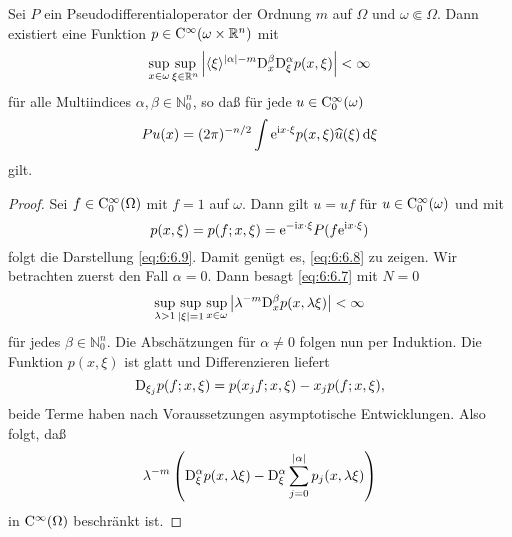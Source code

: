 \begin{thm}
Sei $P$ ein Pseudodifferentialoperator der Ordnung $m$ auf $\Omega$ und $\omega\Subset\Omega$. Dann existiert eine Funktion
$p\in\mathrm C^\infty(\omega\times\mathbb R^n)$ mit
\begin{equation}\label{eq:6:6.8}
     \sup_{x\in\omega} \sup_{\xi\in\mathbb R^n} \left| \langle\xi\rangle^{|\alpha|-m} \mathrm D_x^\beta \mathrm D_\xi^\alpha p(x,\xi) \right| < \infty
\end{equation}
für alle Multiindices $\alpha,\beta\in\mathbb N_0^n$, so daß für jede $u\in\mathrm C_0^\infty(\omega)$
\begin{equation}\label{eq:6:6.9}
   Pu(x) = (2\pi)^{-n/2} \int \mathrm e^{\mathrm i x\cdot\xi} p(x,\xi) \widehat u(\xi) \,\mathrm d\xi
\end{equation}
gilt.
\end{thm}
\begin{proof}
Sei $f\in\mathrm C_0^\infty(\Omega)$ mit $f=1$ auf $\omega$. Dann gilt $u=uf$ für $u\in\mathrm C_0^\infty(\omega)$ und mit 
\begin{equation}
   p(x,\xi) = p(f;x,\xi) =   \mathrm e^{-\mathrm i x\cdot\xi} P(f\mathrm e^{\mathrm i x\cdot\xi})
\end{equation}
folgt die Darstellung \eqref{eq:6:6.9}. Damit genügt es, \eqref{eq:6:6.8} zu zeigen. Wir betrachten zuerst den Fall $\alpha=0$. Dann besagt \eqref{eq:6:6.7} mit $N=0$
\begin{equation}
  \sup_{\lambda>1} \sup_{|\xi|=1} \sup_{x\in\omega} \left| \lambda^{-m} \mathrm D_x^\beta p(x,\lambda\xi) \right|<\infty
\end{equation}
für jedes $\beta\in\mathbb N_0^n$. Die Abschätzungen für $\alpha\ne0$ folgen nun per Induktion. Die Funktion $p(x,\xi)$ ist glatt und Differenzieren liefert
\begin{equation}
    \mathrm D_{\xi_j} p(f;x,\xi) = p(x_jf; x,\xi)- x_j p(f;x,\xi) ,
\end{equation}
beide Terme haben nach Voraussetzungen asymptotische Entwicklungen. Also folgt, daß
\begin{equation}
   \lambda^{-m}  \left( \mathrm D_\xi^\alpha p(x,\lambda \xi) - \mathrm D_\xi^\alpha \sum_{j=0}^{|\alpha|} p_j(x,\lambda\xi) \right)
\end{equation}
in $\mathrm C^\infty(\Omega)$ beschränkt ist.

\end{proof}

